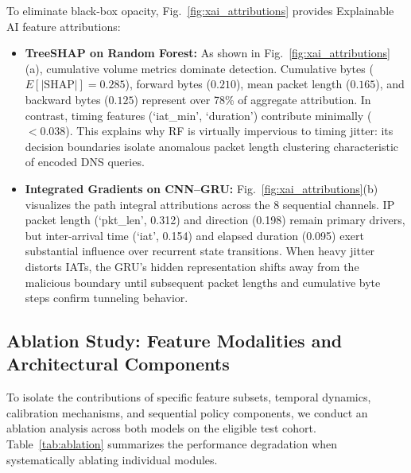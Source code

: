 \documentclass[conference]{IEEEtran}
\begin{document}
To eliminate black-box opacity, Fig.~\ref{fig:xai_attributions} provides Explainable AI feature attributions:
\begin{itemize}
    \item \textbf{TreeSHAP on Random Forest:} As shown in Fig.~\ref{fig:xai_attributions}(a), cumulative volume metrics dominate detection. Cumulative bytes ($E[|\mathrm{SHAP}|]=0.285$), forward bytes ($0.210$), mean packet length ($0.165$), and backward bytes ($0.125$) represent over 78\% of aggregate attribution. In contrast, timing features (`iat\_min', `duration') contribute minimally ($<0.038$). This explains why RF is virtually impervious to timing jitter: its decision boundaries isolate anomalous packet length clustering characteristic of encoded DNS queries.
    \item \textbf{Integrated Gradients on CNN--GRU:} Fig.~\ref{fig:xai_attributions}(b) visualizes the path integral attributions across the 8 sequential channels. IP packet length (`pkt\_len', 0.312) and direction (0.198) remain primary drivers, but inter-arrival time (`iat', 0.154) and elapsed duration (0.095) exert substantial influence over recurrent state transitions. When heavy jitter distorts IATs, the GRU's hidden representation shifts away from the malicious boundary until subsequent packet lengths and cumulative byte steps confirm tunneling behavior.
\end{itemize}

\subsection{Ablation Study: Feature Modalities and Architectural Components}
To isolate the contributions of specific feature subsets, temporal dynamics, calibration mechanisms, and sequential policy components, we conduct an ablation analysis across both models on the eligible test cohort. Table~\ref{tab:ablation} summarizes the performance degradation when systematically ablating individual modules.
\end{document}
